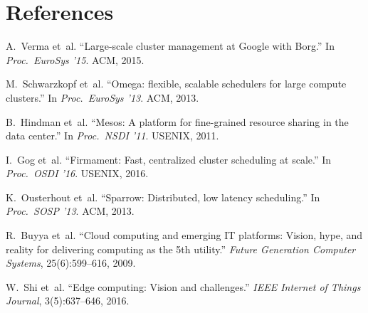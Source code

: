 \documentclass[11pt,a4paper]{article}
\begin{document}
\section*{References}

\begin{enumerate}[label={[\arabic*]}, leftmargin=2.5em]

  \item A.~Verma et~al. ``Large-scale cluster management at Google with Borg.''
        In \textit{Proc.\ EuroSys '15}. ACM, 2015.

  \item M.~Schwarzkopf et~al. ``Omega: flexible, scalable schedulers for large compute clusters.''
        In \textit{Proc.\ EuroSys '13}. ACM, 2013.

  \item B.~Hindman et~al. ``Mesos: A platform for fine-grained resource sharing in the data center.''
        In \textit{Proc.\ NSDI '11}. USENIX, 2011.

  \item I.~Gog et~al. ``Firmament: Fast, centralized cluster scheduling at scale.''
        In \textit{Proc.\ OSDI '16}. USENIX, 2016.

  \item K.~Ousterhout et~al. ``Sparrow: Distributed, low latency scheduling.''
        In \textit{Proc.\ SOSP '13}. ACM, 2013.

  \item R.~Buyya et~al. ``Cloud computing and emerging IT platforms: Vision, hype, and reality
        for delivering computing as the 5th utility.''
        \textit{Future Generation Computer Systems}, 25(6):599--616, 2009.

  \item W.~Shi et~al. ``Edge computing: Vision and challenges.''
        \textit{IEEE Internet of Things Journal}, 3(5):637--646, 2016.

\end{enumerate}
\end{document}
